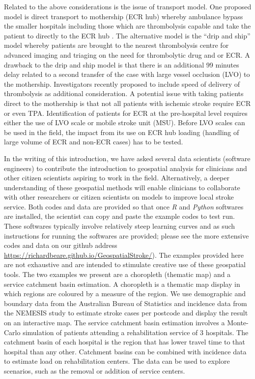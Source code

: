 \documentclass[utf8]{frontiersHLTH}
\begin{document}
Related to the above considerations is the issue of transport
model. One proposed model is direct transport to mothership (ECR hub)
whereby ambulance bypass the smaller hospitals including those which
are thrombolysis capable and take the patient to directly to the ECR
hub \cite{Milne_2017, 10.1001/jamaneurol.2018.2424}. The alternative
model is the ``drip and ship'' model whereby patients are brought to
the nearest thrombolysis centre for advanced imaging and triaging on
the need for thrombolytic drug and or ECR. A drawback to the drip and
ship model is that there is an additional 99 minutes delay related to
a second transfer of the case with large vessel occlusion (LVO) to the
mothership\cite{froehler2017interhospital}. Investigators recently
proposed to include speed of delivery of thrombolysis as additional
consideration\cite{holodinsky2018modeling}. A potential issue with
taking patients direct to the mothership is that not all patients with
ischemic stroke require ECR or even TPA. Identification of patients
for ECR at the pre-hospital level requires either the use of LVO scale
or mobile stroke unit (MSU). Before LVO scales can be used in the
field, the impact from its use on ECR hub loading (handling of large
volume of ECR and non-ECR cases) has to be tested.

In the writing of this introduction, we have asked several data
scientists (software engineers) to contribute the introduction to
geospatial analysis for clinicians and other citizen scientists
aspiring to work in the field. Alternatively, a deeper understanding
of these geospatial methods will enable clinicians to collaborate with
other researchers or citizen scientists on models to improve local
stroke service. Both codes and data are provided so that once {\em R} and
{\em Python} softwares are installed, the scientist can copy and paste the
example codes to test run. These softwares typically involve
relatively steep learning curves and as such instructions for running
the softwares are provided; please see the more extensive codes and
data on our github address \href{https://richardbeare.github.io/GeospatialStroke/}{https://richardbeare.github.io/GeospatialStroke/}).
The examples provided here are not exhaustive and are
intended to stimulate creative use of these geospatial tools. The two
examples we present are a choropleth (thematic map) and a service
catchment basin estimation. A choropleth is a thematic map display in
which regions are coloured by a measure of the region. We use
demographic and boundary data from the Australian Bureau of Statistics
and incidence data from the NEMESIS
\cite{thrift_stroke_2000,azarpazhooh2008patterns} study to estimate
stroke cases per postcode and display the result on an interactive
map. The service catchment basin estimation involves a Monte-Carlo
simulation of patients attending a rehabilitation service of 3
hospitals. The catchment basin of each hospital is the region that has
lower travel time to that hospital than any other. Catchment basins
can be combined with incidence data to estimate load on rehabilitation
centers. The data can be used to explore scenarios, such as the
removal or addition of service centers.
\end{document}
